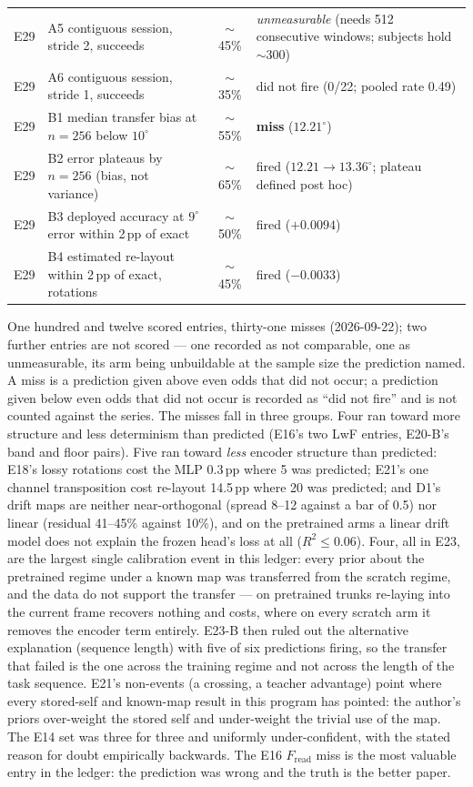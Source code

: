 \begin{center}
\begin{tabular}{@{}llcl@{}}
E29 & A5 contiguous session, stride 2, succeeds & $\sim$45\% & \emph{unmeasurable} (needs 512 consecutive windows; subjects hold $\sim$300) \\
E29 & A6 contiguous session, stride 1, succeeds & $\sim$35\% & did not fire (0/22; pooled rate 0.49) \\
E29 & B1 median transfer bias at $n=256$ below $10^\circ$ & $\sim$55\% & \textbf{miss} ($12.21^\circ$) \\
E29 & B2 error plateaus by $n=256$ (bias, not variance) & $\sim$65\% & fired ($12.21 \to 13.36^\circ$; plateau defined post hoc) \\
E29 & B3 deployed accuracy at $9^\circ$ error within 2\,pp of exact & $\sim$50\% & fired ($+0.0094$) \\
E29 & B4 estimated re-layout within 2\,pp of exact, rotations & $\sim$45\% & fired ($-0.0033$) \\
\bottomrule
\end{tabular}
\end{center}

One hundred and twelve scored entries, thirty-one misses (2026-09-22); two
further entries are not scored --- one recorded as not comparable, one as
unmeasurable, its arm being unbuildable at the sample size the prediction
named. A miss is a prediction
given above even odds that did not occur; a prediction given below even odds
that did not occur is recorded as ``did not fire'' and is not counted against
the series. The misses fall in three groups. Four ran toward more structure and less
determinism than predicted (E16's two LwF entries, E20-B's band and floor
pairs). Five ran toward \emph{less} encoder structure than predicted: E18's
lossy rotations cost the MLP 0.3\,pp where 5 was predicted; E21's one channel
transposition cost re-layout 14.5\,pp where 20 was predicted; and D1's drift
maps are neither near-orthogonal (spread 8--12 against a bar of 0.5) nor
linear (residual 41--45\% against 10\%), and on the pretrained arms a linear
drift model does not explain the frozen head's loss at all ($R^2 \le 0.06$).
Four, all in E23, are the largest single calibration event in this ledger:
every prior about the pretrained regime under a known map was transferred
from the scratch regime, and the data do not support the transfer --- on
pretrained trunks re-laying into the current frame recovers nothing and
costs, where on every scratch arm it removes the encoder term entirely.
E23-B then ruled out the alternative explanation (sequence length) with five
of six predictions firing, so the transfer that failed is the one across the
training regime and not across the length of the task sequence.
E21's
non-events (a crossing, a teacher advantage) point where every stored-self
and known-map result in this program has pointed: the author's priors
over-weight the stored self and under-weight the trivial use of the map. The E14 set was three
for three and uniformly under-confident, with the stated reason for doubt
empirically backwards. The E16 $F_{\mathrm{read}}$ miss is the most valuable
entry in the ledger: the prediction was wrong and the truth is the better paper.


